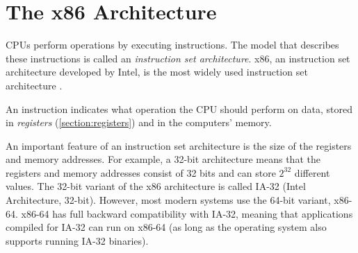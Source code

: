 \section{The x86 Architecture}\label{section:background x86}
CPUs perform operations by executing instructions. The model that describes these instructions is called an \emph{instruction set architecture}. x86, an instruction set architecture developed by Intel, is the most widely used instruction set architecture \cite{x86-dominance}.

An instruction indicates what operation the CPU should perform on data, stored in \emph{registers} (\autoref{section:registers}) and in the computers' memory.

An important feature of an instruction set architecture is the size of the registers and memory addresses. For example, a 32-bit architecture means that the registers and memory addresses consist of 32 bits and can store $2^{32}$ different values. The 32-bit variant of the x86 architecture is called IA-32 (Intel Architecture, 32-bit). However, most modern systems use the 64-bit variant, x86-64. x86-64 has full backward compatibility with IA-32, meaning that applications compiled for IA-32 can run on x86-64 (as long as the operating system also supports running IA-32 binaries).




